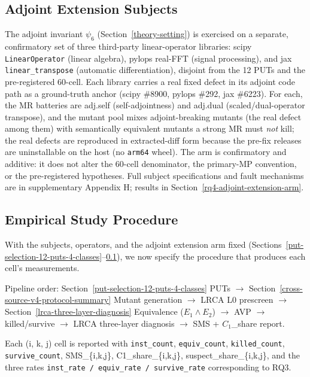 \documentclass[manuscript,screen,review]{acmart}
\begin{document}
\subsection{Adjoint Extension Subjects}\label{adjoint-extension-arm-subjects}

The adjoint invariant $\psi_6$ (Section~\ref{theory-setting}) is exercised on a separate,
confirmatory set of three third-party linear-operator libraries:
scipy \texttt{LinearOperator} (linear algebra), pylops real-FFT (signal
processing), and jax \texttt{linear\_transpose} (automatic
differentiation), disjoint from the 12 PUTs and the pre-registered
60-cell. Each library carries a real fixed defect in its adjoint code
path as a ground-truth anchor (scipy \#8900, pylops \#292, jax \#6223).
For each, the MR batteries are adj.self (self-adjointness) and adj.dual
(scaled/dual-operator transpose), and the mutant pool mixes
adjoint-breaking mutants (the real defect among them) with semantically
equivalent mutants a strong MR must \emph{not} kill; the real defects are
reproduced in extracted-diff form because the pre-fix releases are
uninstallable on the host (no \texttt{arm64} wheel). The arm is
confirmatory and additive: it does not alter the 60-cell denominator, the
primary-MP convention, or the pre-registered hypotheses. Full subject
specifications and fault mechanisms are in supplementary Appendix H;
results in Section~\ref{rq4-adjoint-extension-arm}.

\subsection{Empirical Study Procedure}\label{procedure-overview}

With the subjects, operators, and the adjoint extension arm fixed
(Sections~\ref{put-selection-12-puts-4-classes}--\ref{adjoint-extension-arm-subjects}), we now specify the procedure that produces each cell's
measurements.

\noindent\textsf{\small Pipeline order: Section~\ref{put-selection-12-puts-4-classes} PUTs $\to$ Section~\ref{cross-source-v4-protocol-summary} Mutant generation $\to$ LRCA L0 prescreen $\to$ Section~\ref{lrca-three-layer-diagnosis} Equivalence ($E_1 \wedge E_2$) $\to$ AVP $\to$ killed/survive $\to$ LRCA three-layer diagnosis $\to$ SMS + $C_1$\_share report.}

Each (i, k, j) cell is reported with \texttt{inst\_count},
\texttt{equiv\_count}, \texttt{killed\_count}, \texttt{survive\_count},
SMS\_\{i,k,j\}, C1\_share\_\{i,k,j\}, suspect\_share\_\{i,k,j\}, and the
three rates \texttt{inst\_rate\ /\ equiv\_rate\ /\ survive\_rate}
corresponding to RQ3.
\end{document}
